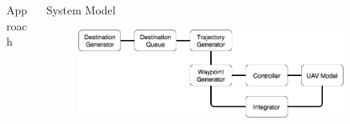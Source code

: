 \documentclass[final]{beamer}
\newlength{\sepwid}
\newlength{\onecolwid}
\newlength{\twocolwid}
\begin{document}
\begin{frame}[t]
\begin{columns}[t]
\begin{column}{\onecolwid}

\end{column} %

\begin{column}{\sepwid}\end{column} %

\begin{column}{\twocolwid} %

\begin{columns}[t,totalwidth=\twocolwid] %

\begin{column}{\onecolwid}\vspace{-.6in} %


\begin{block}{Approach}


\end{block}


\end{column} %

\begin{column}{\onecolwid}\vspace{-.6in} %


\begin{block}{System Model}



\begin{figure}
\includegraphics[width=1\linewidth]{TopLevelDesign.png}
\end{figure}


\end{block}
\end{column}
\end{columns}
\end{column}
\end{columns}
\end{frame}
\end{document}
